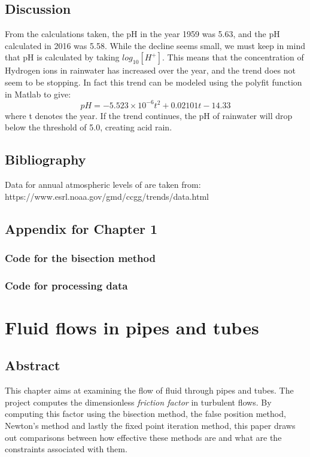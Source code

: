\documentclass{book}
\begin{document}
	\section{Discussion}
	From the calculations taken, the pH in the year 1959 was 5.63, and the pH calculated in 2016 was 5.58. While the decline seems small, we must keep in mind that pH is calculated by taking ${log_{10}}{[H^+]}$. This means that the concentration of Hydrogen ions in rainwater has increased over the year, and the trend does not seem to be stopping. In fact this trend can be modeled using the polyfit function in Matlab to give:
	\[pH = -5.523 \times 10^{-6}t^2 + 0.02101t - 14.33\] 
	where t denotes the year. If the trend continues, the pH of rainwater will drop below the threshold of 5.0, creating acid rain.
	\section{Bibliography}
	Data for annual atmospheric levels of  are taken from: \\
	https://www.esrl.noaa.gov/gmd/ccgg/trends/data.html
	\newpage
	\section{Appendix for Chapter 1}
	\subsection{Code for the bisection method}
	
	\subsection{Code for processing data}
	

	\chapter{Fluid flows in pipes and tubes}
	\section{Abstract}
	This chapter aims at examining the flow of fluid through pipes and tubes. The project computes the dimensionless \textit{friction factor} in turbulent flows. By computing this factor using the bisection method, the false position method, Newton's method and lastly the fixed point iteration method, this paper draws out comparisons between how effective these methods are and what are the constraints associated with them.
	
\end{document}
